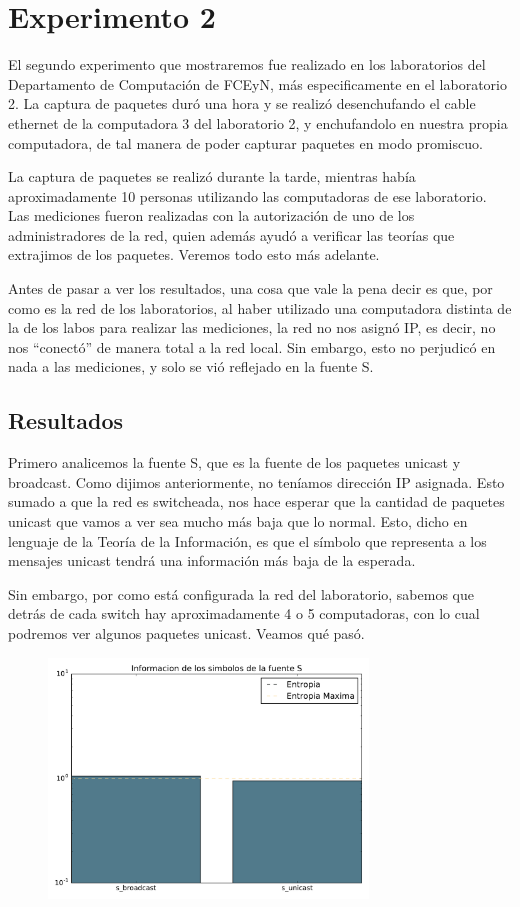 \section{Experimento 2}

El segundo experimento que mostraremos fue realizado en los laboratorios del Departamento de Computación de FCEyN, más especificamente en el laboratorio 2.
La captura de paquetes duró una hora y se realizó desenchufando el cable ethernet de la computadora 3 del laboratorio 2, y enchufandolo en nuestra propia computadora, de tal manera de poder capturar paquetes en modo promiscuo.

La captura de paquetes se realizó durante la tarde, mientras había aproximadamente 10 personas utilizando las computadoras de ese laboratorio. Las mediciones fueron realizadas con la autorización de uno de los administradores de la red, quien además ayudó a verificar las teorías que extrajimos de los paquetes. Veremos todo esto más adelante.

Antes de pasar a ver los resultados, una cosa que vale la pena decir es que, por como es la red de los laboratorios, al haber utilizado una computadora distinta de la de los labos para realizar las mediciones, la red no nos asignó IP, es decir, no nos ``conectó'' de manera total a la red local. Sin embargo, esto no perjudicó en nada a las mediciones, y solo se vió reflejado en la fuente S.


\subsection{Resultados}

Primero analicemos la fuente S, que es la fuente de los paquetes unicast y broadcast. Como dijimos anteriormente, no teníamos dirección IP asignada. Esto sumado a que la red es switcheada, nos hace esperar que la cantidad de paquetes unicast que vamos a ver sea mucho más baja que lo normal. Esto, dicho en lenguaje de la Teoría de la Información, es que el símbolo que representa a los mensajes unicast tendrá una información más baja de la esperada.

Sin embargo, por como está configurada la red del laboratorio, sabemos que detrás de cada switch hay aproximadamente 4 o 5 computadoras, con lo cual podremos ver algunos paquetes unicast. Veamos qu\'e pasó.

\begin{figure}[H]
  \centering
  \includegraphics[width=8.5cm]{exp_labo/grafico1.pdf}
  \caption{\normalfont }
\end{figure}


